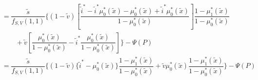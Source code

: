 \documentclass{article}
\begin{document}
\begin{align*}
   &=\dfrac{\widetilde s}{f_{S,V}(1, 1)}  \bigg\{(1 - \widetilde v) \left[ \dfrac{\widetilde i^* - \widetilde i^* \mu^*_0(\widetilde x) - \mu^*_0(\widetilde x) + \widetilde i^* \mu^*_0(\widetilde x)}{1 - \mu^*_0(\widetilde x)}\right]\dfrac{1 - \mu^*_1(\widetilde x)}{1 - \mu^*_0(\widetilde x)} \\
   &\qquad + \widetilde v \left[\dfrac{\mu^*_0(\widetilde x)}{1 - \mu^*_0(\widetilde x)} - \widetilde i^* \dfrac{\mu^*_0(\widetilde x)}{1 - \mu^*_0(\widetilde x)}\right]   \bigg\}  - \Psi(P) \\
   &=\dfrac{\widetilde s}{f_{S,V}(1, 1)}  \bigg\{(1 - \widetilde v) \{\widetilde i^* - \mu^*_0(\widetilde x)\}\dfrac{1 - \mu^*_1(\widetilde x)}{1 - \mu^*_0(\widetilde x)} + \widetilde v \mu^*_0(\widetilde x) \dfrac{1 - \mu^*_1(\widetilde x)}{1 - \mu^*_0(\widetilde x)}  \bigg\}  - \Psi(P) 
\end{align*}
\end{document}
